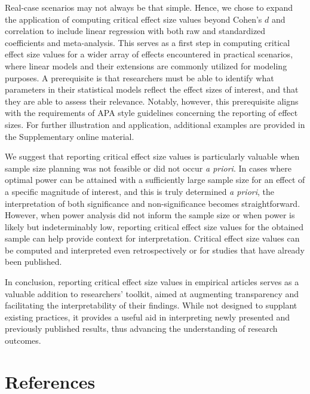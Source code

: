 \documentclass[
  man,floatsintext]{apa7}
\begin{document}
Real-case scenarios may not always be that simple. Hence, we chose to expand the application of computing critical effect size values beyond Cohen's \(d\) and correlation to include linear regression with both raw and standardized coefficients and meta-analysis. This serves as a first step in computing critical effect size values for a wider array of effects encountered in practical scenarios, where linear models and their extensions are commonly utilized for modeling purposes. A prerequisite is that researchers must be able to identify what parameters in their statistical models reflect the effect sizes of interest, and that they are able to assess their relevance. Notably, however, this prerequisite aligns with the requirements of APA style guidelines concerning the reporting of effect sizes. For further illustration and application, additional examples are provided in the Supplementary online material.

We suggest that reporting critical effect size values is particularly valuable when sample size planning was not feasible or did not occur \textit{a priori}. In cases where optimal power can be attained with a sufficiently large sample size for an effect of a specific magnitude of interest, and this is truly determined \textit{a priori}, the interpretation of both significance and non-significance becomes straightforward. However, when power analysis did not inform the sample size or when power is likely but indeterminably low, reporting critical effect size values for the obtained sample can help provide context for interpretation. Critical effect size values can be computed and interpreted even retrospectively or for studies that have already been published.

In conclusion, reporting critical effect size values in empirical articles serves as a valuable addition to researchers' toolkit, aimed at augmenting transparency and facilitating the interpretability of their findings. While not designed to supplant existing practices, it provides a useful aid in interpreting newly presented and previously published results, thus advancing the understanding of research outcomes.

\newpage

\hypertarget{references}{%
\section{References}\label{references}}
\end{document}
